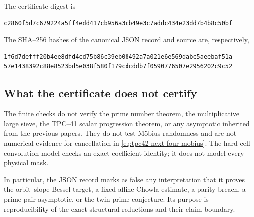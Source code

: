 The certificate digest is
\begin{verbatim}
c2860f5d7c679224a5ff4edd417cb956a3cb49e3c7addc434e23dd7b4b8c50bf
\end{verbatim}
The SHA--256 hashes of the canonical JSON record and source are,
respectively,
\begin{verbatim}
1f6d7defff20b4ee8dfd4cd75b86c39eb08492a7a021e6e569dabc5aeebaf51a
57e1438392c88e8523bd5e038f580f179cdcddb7f0590776507e2956202c9c52
\end{verbatim}

\subsection{What the certificate does not certify}

The finite checks do not verify the prime number theorem, the
multiplicative large sieve, the TPC--41 scalar progression theorem, or any
asymptotic inherited from the previous papers.  They do not test M\"obius
randomness and are not numerical evidence for cancellation in
\eqref{eq:tpc42-next-four-mobius}.  The hard-cell convolution model checks
an exact coefficient identity; it does not model every physical mask.

In particular, the JSON record marks as false any interpretation that it
proves the orbit--slope Bessel target, a fixed affine Chowla estimate, a
parity breach, a prime-pair asymptotic, or the twin-prime conjecture.  Its
purpose is reproducibility of the exact structural reductions and their
claim boundary.
